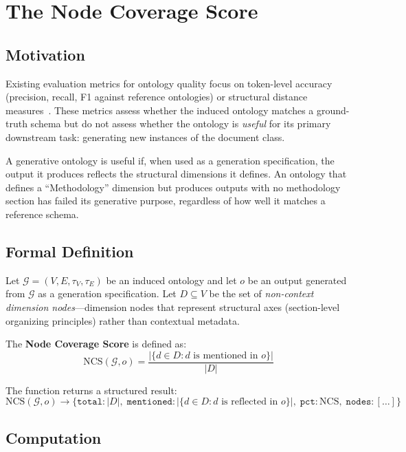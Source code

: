 \documentclass[runningheads,a4paper]{llncs}
\begin{document}
\section{The Node Coverage Score}
\label{sec:metric}

\subsection{Motivation}

Existing evaluation metrics for ontology quality focus on token-level
accuracy (precision, recall, F1 against reference ontologies) or
structural distance measures~\cite{lo2024endtoend}. These metrics assess
whether the induced ontology matches a ground-truth schema but do not
assess whether the ontology is \emph{useful} for its primary downstream
task: generating new instances of the document class.

A generative ontology is useful if, when used as a generation
specification, the output it produces reflects the structural dimensions
it defines. An ontology that defines a ``Methodology'' dimension but
produces outputs with no methodology section has failed its generative
purpose, regardless of how well it matches a reference schema.

\subsection{Formal Definition}

Let $\mathcal{G} = (V, E, \tau_V, \tau_E)$ be an induced ontology and
let $o$ be an output generated from $\mathcal{G}$ as a generation
specification. Let $D \subseteq V$ be the set of \emph{non-context
dimension nodes}---dimension nodes that represent structural axes
(section-level organizing principles) rather than contextual metadata.

The \textbf{Node Coverage Score} is defined as:
\[
  \text{NCS}(\mathcal{G}, o) = \frac{|\{d \in D : d \text{ is mentioned in } o\}|}{|D|}
\]

The function returns a structured result:
\[
  \text{NCS}(\mathcal{G}, o) \rightarrow \{
    \texttt{total}: |D|,\;
    \texttt{mentioned}: |\{d \in D : d \text{ is reflected in } o\}|,\;
    \texttt{pct}: \text{NCS},\;
    \texttt{nodes}: [\ldots]
  \}
\]

\subsection{Computation}
\end{document}
